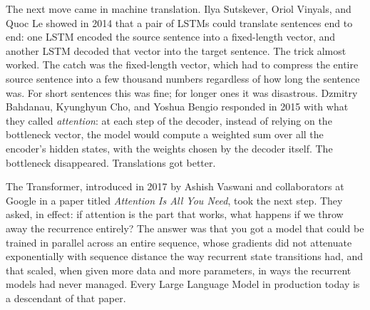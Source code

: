 The next move came in machine translation. Ilya Sutskever, Oriol
Vinyals, and Quoc Le showed in 2014 that a pair of LSTMs could
translate sentences end to end: one LSTM encoded the source
sentence into a fixed-length vector, and another LSTM decoded that
vector into the target sentence. The trick almost worked. The
catch was the fixed-length vector, which had to compress the entire
source sentence into a few thousand numbers regardless of how long
the sentence was. For short sentences this was fine; for longer
ones it was disastrous. Dzmitry Bahdanau, Kyunghyun Cho, and Yoshua
Bengio responded in 2015 with what they called \emph{attention}: at
each step of the decoder, instead of relying on the bottleneck
vector, the model would compute a weighted sum over all the
encoder's hidden states, with the weights chosen by the decoder
itself. The bottleneck disappeared. Translations got better.

The Transformer, introduced in 2017 by Ashish Vaswani and
collaborators at Google in a paper titled \emph{Attention Is All You
Need}, took the next step. They asked, in effect: if attention is
the part that works, what happens if we throw away the recurrence
entirely? The answer was that you got a model that could be trained
in parallel across an entire sequence, whose gradients did not
attenuate exponentially with sequence distance the way recurrent
state transitions had, and that scaled, when given more data
and more parameters, in ways the recurrent models had never
managed. Every Large Language Model in production today is a
descendant of that paper.


